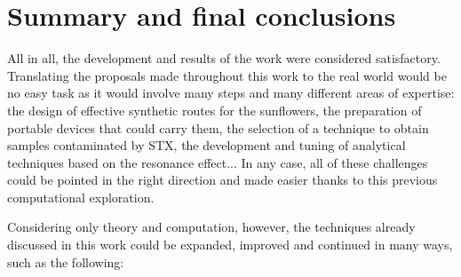 \chapter{Summary and final conclusions}

All in all, the development and results of the work were considered satisfactory.
Translating the proposals made throughout this work to the real world would be no easy task as it would involve many steps and many different areas of expertise: the design of effective synthetic routes for the sunflowers, the preparation of portable devices that could carry them, the selection of a technique to obtain samples contaminated by STX, the development and tuning of analytical techniques based on the resonance effect...
In any case, all of these challenges could be pointed in the right direction and made easier thanks to this previous computational exploration.

Considering only theory and computation, however, the techniques already discussed in this work could be expanded, improved and continued in many ways, such as the following:

